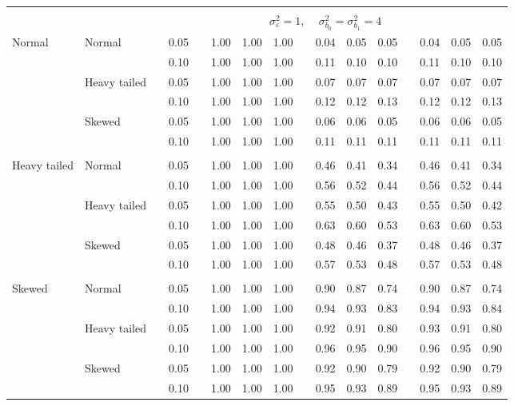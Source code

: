 \begin{table}[ht]
\begin{scriptsize}
\begin{center}
\begin{tabular}{ll p{.1cm} c p{.1cm} rrr p{.1cm} rrr p{.1cm} rrr}
&&&&&&&&&&&&&&&\\
& && && \multicolumn{9}{c}{$\sigma_{\varepsilon}^2 = 1$, \ \ $\sigma_{b_0}^2 = \sigma_{b_1}^2 = 4$} \\ \cline{6-16}

\rowcolor{gray!20} Normal       & Normal       && 0.05 &&  1.00 & 1.00 & 1.00 && 0.04 & 0.05 & 0.05 && 0.04 & 0.05 & 0.05 \\ 
\rowcolor{gray!20}             &              && 0.10 &&  1.00 & 1.00 & 1.00 && 0.11 & 0.10 & 0.10 && 0.11 & 0.10 & 0.10 \\ 
\rowcolor{gray!20}             & Heavy tailed && 0.05 &&  1.00 & 1.00 & 1.00 && 0.07 & 0.07 & 0.07 && 0.07 & 0.07 & 0.07 \\ 
\rowcolor{gray!20}             &              && 0.10 &&  1.00 & 1.00 & 1.00 && 0.12 & 0.12 & 0.13 && 0.12 & 0.12 & 0.13 \\ 
\rowcolor{gray!20}             & Skewed       && 0.05 &&  1.00 & 1.00 & 1.00 && 0.06 & 0.06 & 0.05 && 0.06 & 0.06 & 0.05 \\ 
\rowcolor{gray!20}             &              && 0.10 &&  1.00 & 1.00 & 1.00 && 0.11 & 0.11 & 0.11 && 0.11 & 0.11 & 0.11 \\ 
             &&&&&&&&&&&&&&&\\
Heavy tailed & Normal       && 0.05 &&  1.00 & 1.00 & 1.00 && 0.46 & 0.41 & 0.34 && 0.46 & 0.41 & 0.34 \\ 
             &              && 0.10 &&  1.00 & 1.00 & 1.00 && 0.56 & 0.52 & 0.44 && 0.56 & 0.52 & 0.44 \\ 
             & Heavy tailed && 0.05 &&  1.00 & 1.00 & 1.00 && 0.55 & 0.50 & 0.43 && 0.55 & 0.50 & 0.42 \\ 
             &              && 0.10 &&  1.00 & 1.00 & 1.00 && 0.63 & 0.60 & 0.53 && 0.63 & 0.60 & 0.53 \\ 
             & Skewed       && 0.05 &&  1.00 & 1.00 & 1.00 && 0.48 & 0.46 & 0.37 && 0.48 & 0.46 & 0.37 \\ 
             &              && 0.10 &&  1.00 & 1.00 & 1.00 && 0.57 & 0.53 & 0.48 && 0.57 & 0.53 & 0.48 \\ 
             &&&&&&&&&&&&&&&\\
Skewed       & Normal       && 0.05 &&  1.00 & 1.00 & 1.00 && 0.90 & 0.87 & 0.74 && 0.90 & 0.87 & 0.74 \\ 
             &              && 0.10 &&  1.00 & 1.00 & 1.00 && 0.94 & 0.93 & 0.83 && 0.94 & 0.93 & 0.84 \\ 
             & Heavy tailed && 0.05 &&  1.00 & 1.00 & 1.00 && 0.92 & 0.91 & 0.80 && 0.93 & 0.91 & 0.80 \\ 
             &              && 0.10 &&  1.00 & 1.00 & 1.00 && 0.96 & 0.95 & 0.90 && 0.96 & 0.95 & 0.90 \\ 
             & Skewed       && 0.05 &&  1.00 & 1.00 & 1.00 && 0.92 & 0.90 & 0.79 && 0.92 & 0.90 & 0.79 \\ 
             &              && 0.10 &&  1.00 & 1.00 & 1.00 && 0.95 & 0.93 & 0.89 && 0.95 & 0.93 & 0.89 \\ 


\end{tabular}
\end{center}
\end{scriptsize}
\end{table}
